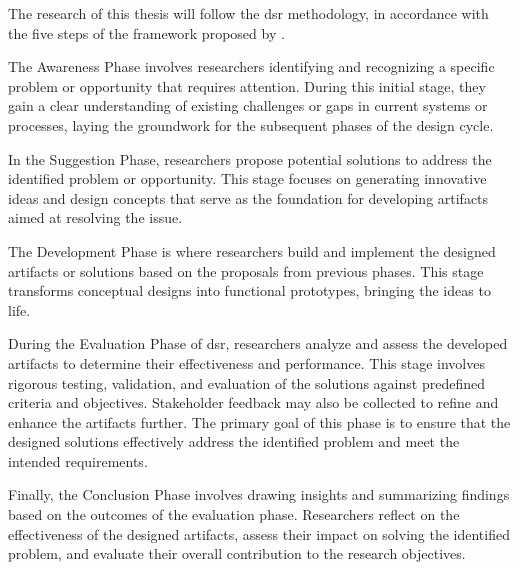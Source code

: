 The research of this thesis will follow the \gls{dsr} methodology, in accordance with the five steps of the framework proposed by \textcite{Hevner2010}.

The Awareness Phase involves researchers identifying and recognizing a specific problem or opportunity that requires attention.
During this initial stage, they gain a clear understanding of existing challenges or gaps in current systems or processes, laying the groundwork for the subsequent phases of the design cycle.

In the Suggestion Phase, researchers propose potential solutions to address the identified problem or opportunity.
This stage focuses on generating innovative ideas and design concepts that serve as the foundation for developing artifacts aimed at resolving the issue.

The Development Phase is where researchers build and implement the designed artifacts or solutions based on the proposals from previous phases.
This stage transforms conceptual designs into functional prototypes, bringing the ideas to life.

During the Evaluation Phase of \gls{dsr}, researchers analyze and assess the developed artifacts to determine their effectiveness and performance.
This stage involves rigorous testing, validation, and evaluation of the solutions against predefined criteria and objectives.
Stakeholder feedback may also be collected to refine and enhance the artifacts further.
The primary goal of this phase is to ensure that the designed solutions effectively address the identified problem and meet the intended requirements.

Finally, the Conclusion Phase involves drawing insights and summarizing findings based on the outcomes of the evaluation phase.
Researchers reflect on the effectiveness of the designed artifacts, assess their impact on solving the identified problem, and evaluate their overall contribution to the research objectives.

